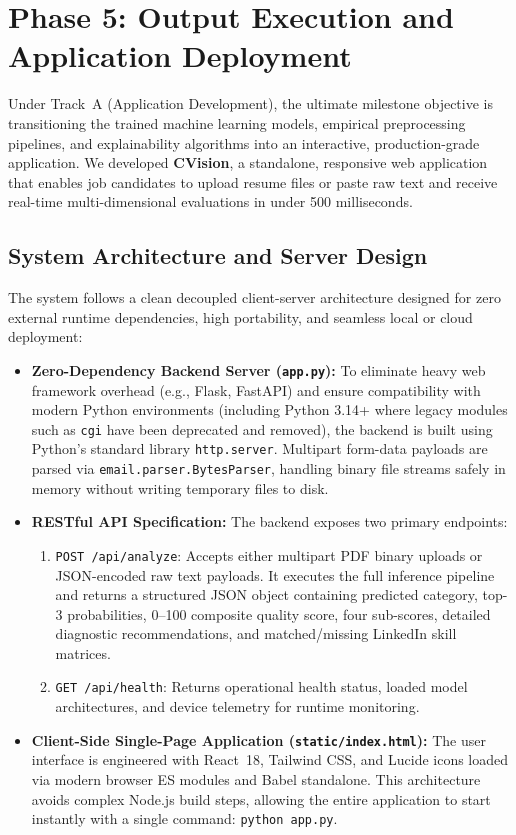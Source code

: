 \documentclass[11pt,a4paper]{article}
\begin{document}
\section{Phase 5: Output Execution and Application Deployment}
\label{sec:phase5}

Under Track~A (Application Development), the ultimate milestone objective is
transitioning the trained machine learning models, empirical preprocessing
pipelines, and explainability algorithms into an interactive, production-grade
application. We developed \textbf{CVision}, a standalone, responsive web application
that enables job candidates to upload resume files or paste raw text and receive
real-time multi-dimensional evaluations in under 500 milliseconds.

\subsection{System Architecture and Server Design}
\label{sec:arch}

The system follows a clean decoupled client-server architecture designed for
zero external runtime dependencies, high portability, and seamless local or
cloud deployment:

\begin{itemize}
  \item \textbf{Zero-Dependency Backend Server (\texttt{app.py}):} To eliminate
  heavy web framework overhead (e.g., Flask, FastAPI) and ensure compatibility
  with modern Python environments (including Python 3.14+ where legacy modules
  such as \texttt{cgi} have been deprecated and removed), the backend is built
  using Python's standard library \texttt{http.server}. Multipart form-data
  payloads are parsed via \texttt{email.parser.BytesParser}, handling binary
  file streams safely in memory without writing temporary files to disk.
  \item \textbf{RESTful API Specification:} The backend exposes two primary
  endpoints:
  \begin{enumerate}
    \item \texttt{POST /api/analyze}: Accepts either multipart PDF binary uploads
    or JSON-encoded raw text payloads. It executes the full inference pipeline
    and returns a structured JSON object containing predicted category, top-3
    probabilities, 0--100 composite quality score, four sub-scores, detailed
    diagnostic recommendations, and matched/missing LinkedIn skill matrices.
    \item \texttt{GET /api/health}: Returns operational health status, loaded
    model architectures, and device telemetry for runtime monitoring.
  \end{enumerate}
  \item \textbf{Client-Side Single-Page Application (\texttt{static/index.html}):}
  The user interface is engineered with React~18, Tailwind CSS, and Lucide icons
  loaded via modern browser ES modules and Babel standalone. This architecture
  avoids complex Node.js build steps, allowing the entire application to start
  instantly with a single command: \texttt{python app.py}.
\end{itemize}
\end{document}
